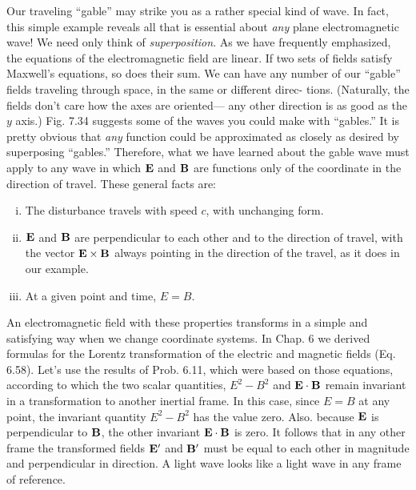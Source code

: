 Our traveling ``gable'' may strike you as a rather special kind of
wave. In fact, this simple example reveals all that is essential about
\emph{any} plane electromagnetic wave! We need only think of 
\emph{superposition}. As we have frequently emphasized, the equations of the
electromagnetic field are linear. If two sets of fields satisfy Maxwell's
equations, so does their sum. We can have any number of our
``gable'' fields traveling through space, in the same or different direc-
tions. (Naturally, the fields don't care how the axes are oriented---
any other direction is as good as the $y$ axis.) Fig. 7.34 suggests some
of the waves you could make with ``gables.'' It is pretty obvious that
\emph{any} function could be approximated as closely as desired by superposing
``gables.'' Therefore, what we have learned about the gable
wave must apply to any wave in which $\mathbf{E}$ and $\mathbf{B}$ are functions only
of the coordinate in the direction of travel. These general facts are:
\begin{enumerate}[(i)]
\item The disturbance travels with speed $c$, with unchanging form. 
\item $\mathbf{E}$ and $\mathbf{B}$ are perpendicular to each other and to the direction
    of travel, with the vector $\mathbf{E}\times\mathbf{B}$ always pointing in the
    direction of the travel, as it does in our example.
\item At a given point and time, $E = B$.
\end{enumerate}

An electromagnetic field with these properties transforms in a
simple and satisfying way when we change coordinate systems. In
Chap. 6 we derived formulas for the Lorentz transformation of the
electric and magnetic fields (Eq. 6.58). Let's use the results of
Prob. 6.11, which were based on those equations, according to which
the two scalar quantities, $E^2 - B^2$ and $\mathbf{E}\cdot\mathbf{B}$ remain invariant in a
transformation to another inertial frame. In this case, since $E = B$
at any point, the invariant quantity $E^2 - B^2$ has the value zero. Also.
because $\mathbf{E}$ is perpendicular to $\mathbf{B}$, the other invariant $\mathbf{E}\cdot\mathbf{B}$ is zero. It
follows that in any other frame the transformed fields $\mathbf{E}'$ and $\mathbf{B}'$ must
be equal to each other in magnitude and perpendicular in direction.
A light wave looks like a light wave in any frame of reference.

